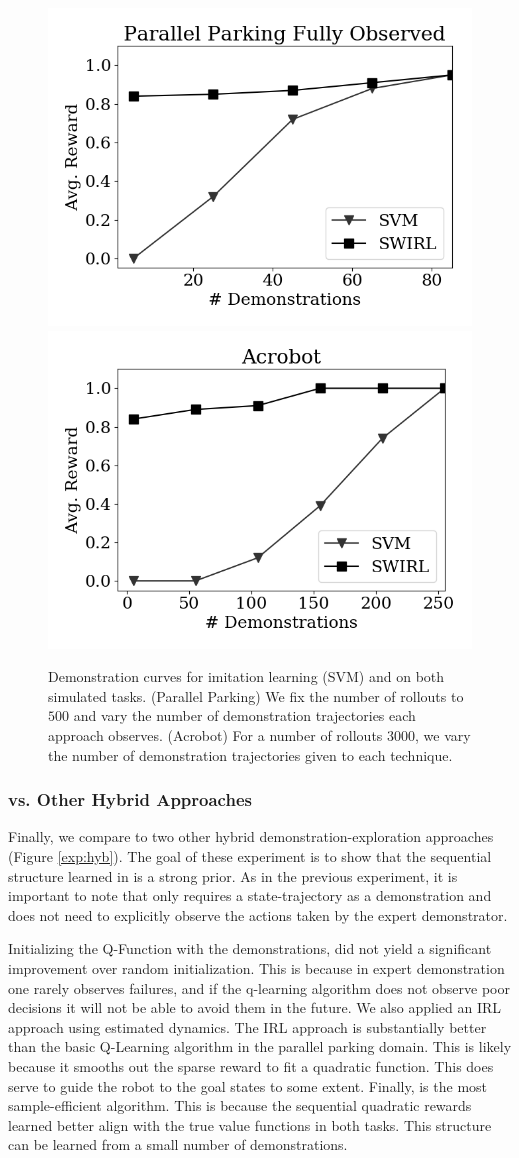 \begin{figure}[ht!]
\centering
 \includegraphics[width=0.48\columnwidth]{swirl-experiments/ppfo-svm1.png}
 \includegraphics[width=0.48\columnwidth]{swirl-experiments/ppfo-svm2.png}
 \caption{Demonstration curves for imitation learning (SVM) and \hirl on both simulated tasks. (Parallel Parking) We fix the number of rollouts to $500$ and vary the number of demonstration trajectories each approach observes. (Acrobot) For a number of rollouts $3000$, we vary the number of demonstration trajectories given to each technique. \label{exp:pd}}
\end{figure}

\subsubsection{\hirl vs. Other Hybrid Approaches}
Finally, we compare \hirl to two other hybrid demonstration-exploration approaches (Figure \ref{exp:hyb}). The goal of these experiment is to show that the sequential structure learned in \hirl is a strong prior. As in the previous experiment, it is important to note that \hirl only requires a state-trajectory as a demonstration and does not need to explicitly observe the actions taken by the expert demonstrator.

Initializing the Q-Function with the demonstrations, did not yield a significant improvement over random initialization. This is because in expert demonstration one rarely observes failures, and if the q-learning algorithm does not observe poor decisions it will not be able to avoid them in the future. We also applied an IRL approach using estimated dynamics. The IRL approach is substantially better than the basic Q-Learning algorithm in the parallel parking domain. This is likely because it smooths out the sparse reward to fit a quadratic function. This does serve to guide the robot to the goal states to some extent. Finally, \hirl is the most sample-efficient algorithm. This is because the sequential quadratic rewards learned better align with the true value functions in both tasks. This structure can be learned from a small number of demonstrations.

